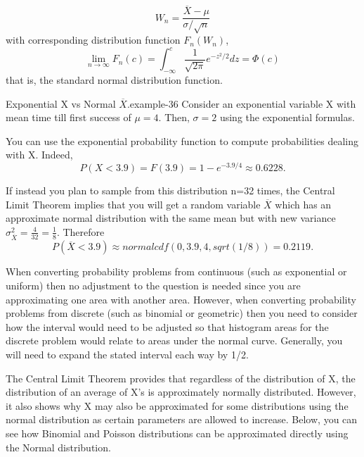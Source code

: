 \documentclass[10pt,]{book}
\numberwithin{equation}{section}
\newcommand{\lt}{<}
\begin{document}
\begin{equation*}
W_n = \frac{\overline{X} - \mu}{\sigma/ \sqrt{n}}
\end{equation*}
with corresponding distribution function \(F_n(W_n)\),%
\begin{equation*}
\lim_{n \rightarrow \infty} F_n(c) = \int_{-\infty}^c \frac{1}{\sqrt{2 \pi}} e^{-z^2/2} dz = \Phi(c)
\end{equation*}
that is, the standard normal distribution function.%
\begin{example}{Exponential X vs Normal \(\overline{X}\).}{example-36}%
\hypertarget{p-1069}{}%
Consider an exponential variable X with mean time till first success of \(\mu = 4\).  Then, \(\sigma = 2\) using the exponential formulas.%
\par
\hypertarget{p-1070}{}%
You can use the exponential probability function to compute probabilities dealing with X. Indeed,%
\begin{equation*}
P(X \lt 3.9) = F(3.9) = 1 - e^{-3.9/4} \approx 0.6228 .
\end{equation*}
%
\par
\hypertarget{p-1071}{}%
If instead you plan to sample from this distribution n=32 times, the Central Limit Theorem implies that you will get a random variable \(\overline{X}\) which has an approximate normal distribution with the same mean but with new variance \(\sigma_{\overline{X}}^2 = \frac{4}{32} = \frac{1}{8}\).  Therefore%
\begin{equation*}
P( \overline{X} \lt 3.9 ) \approx normalcdf(0,3.9,4,sqrt(1/8)) = 0.2119 .
\end{equation*}
%
\end{example}
\hypertarget{p-1072}{}%
When converting probability problems from continuous (such as exponential or uniform) then no adjustment to the question is needed since you are approximating one area with another area. However, when converting probability problems from discrete (such as binomial or geometric) then you need to consider how the interval would need to be adjusted so that histogram areas for the discrete problem would relate to areas under the normal curve. Generally, you will need to expand the stated interval each way by 1/2.%
\par
\hypertarget{p-1073}{}%
The Central Limit Theorem provides that regardless of the distribution of X, the distribution of an average of X's is approximately normally distributed. However, it also shows why X may also be approximated for some distributions using the normal distribution as certain parameters are allowed to increase. Below, you can see how Binomial and Poisson distributions can be approximated directly using the Normal distribution.%
\end{document}
